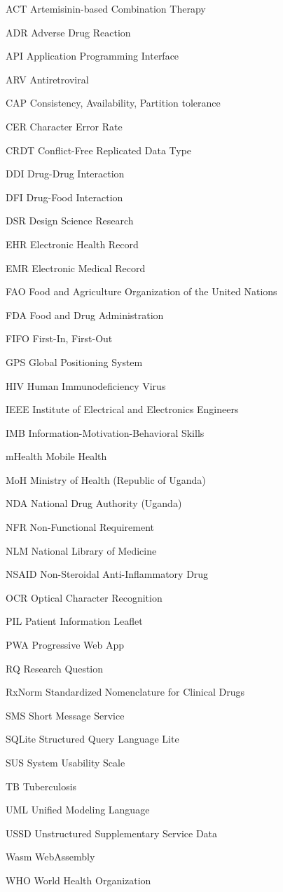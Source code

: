 \documentclass[proposal,openany]{sotuthesis}
\begin{document}
\tableofcontents
\listoffigures
\listoftables

\begin{abbreviations}
  \item[ACT] Artemisinin-based Combination Therapy
  \item[ADR] Adverse Drug Reaction
  \item[API] Application Programming Interface
  \item[ARV] Antiretroviral
  \item[CAP] Consistency, Availability, Partition tolerance
  \item[CER] Character Error Rate
  \item[CRDT] Conflict-Free Replicated Data Type
  \item[DDI] Drug-Drug Interaction
  \item[DFI] Drug-Food Interaction
  \item[DSR] Design Science Research
  \item[EHR] Electronic Health Record
  \item[EMR] Electronic Medical Record
  \item[FAO] Food and Agriculture Organization of the United Nations
  \item[FDA] Food and Drug Administration
  \item[FIFO] First-In, First-Out
  \item[GPS] Global Positioning System
  \item[HIV] Human Immunodeficiency Virus
  \item[IEEE] Institute of Electrical and Electronics Engineers
  \item[IMB] Information-Motivation-Behavioral Skills
  \item[mHealth] Mobile Health
  \item[MoH] Ministry of Health (Republic of Uganda)
  \item[NDA] National Drug Authority (Uganda)
  \item[NFR] Non-Functional Requirement
  \item[NLM] National Library of Medicine
  \item[NSAID] Non-Steroidal Anti-Inflammatory Drug
  \item[OCR] Optical Character Recognition
  \item[PIL] Patient Information Leaflet
  \item[PWA] Progressive Web App
  \item[RQ] Research Question
  \item[RxNorm] Standardized Nomenclature for Clinical Drugs
  \item[SMS] Short Message Service
  \item[SQLite] Structured Query Language Lite
  \item[SUS] System Usability Scale
  \item[TB] Tuberculosis
  \item[UML] Unified Modeling Language
  \item[USSD] Unstructured Supplementary Service Data
  \item[Wasm] WebAssembly
  \item[WHO] World Health Organization
\end{abbreviations}
\end{document}
